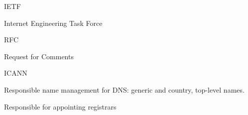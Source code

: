 \documentclass[main.tex]{subfiles}
\begin{document}
\small

\layer{}

\begin{card}{IETF}
\item Internet Engineering Task Force
\end{card}

\begin{card}{RFC}
\item Request for Comments
\end{card}

\begin{card}{ICANN}
\item Responsible name management for DNS: generic and country, top-level names.
\item Responsible for appointing registrars
\end{card}
\end{document}
